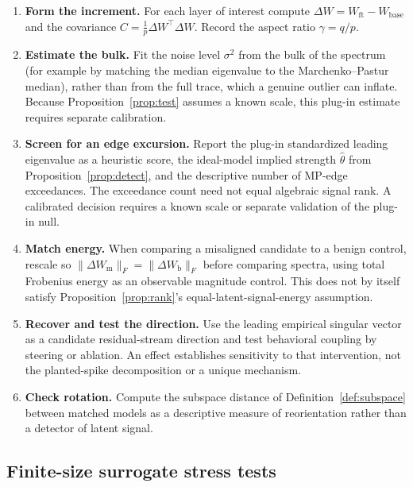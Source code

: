 \documentclass[11pt]{article}
\theoremstyle{definition}
\theoremstyle{remark}
\newcommand{\norm}[1]{\lVert #1 \rVert}
\newcommand{\dW}{\Delta W}
\begin{document}
\begin{enumerate}[leftmargin=1.6em,itemsep=3pt]
\item \textbf{Form the increment.} For each layer of interest compute $\dW = W_{\mathrm{ft}}
- W_{\mathrm{base}}$ and the covariance $C = \tfrac1p \dW^{\!\top}\dW$. Record the aspect
ratio $\gamma = q/p$.
\item \textbf{Estimate the bulk.} Fit the noise level $\sigma^2$ from the bulk of the
spectrum (for example by matching the median eigenvalue to the Marchenko--Pastur median),
rather than from the full trace, which a genuine outlier can inflate. Because
Proposition~\ref{prop:test} assumes a known scale, this plug-in estimate requires separate
calibration.
\item \textbf{Screen for an edge excursion.} Report the plug-in standardized leading
eigenvalue as a heuristic score, the ideal-model implied strength $\hat\theta$ from
Proposition~\ref{prop:detect}, and the descriptive number of MP-edge exceedances. The
exceedance count need not equal algebraic signal rank. A calibrated decision requires a
known scale or separate validation of the plug-in null.
\item \textbf{Match energy.} When comparing a misaligned candidate to a benign control,
rescale so $\norm{\dW_{\mathrm m}}_F = \norm{\dW_{\mathrm b}}_F$ before comparing spectra,
using total Frobenius energy as an observable magnitude control. This does not by
itself satisfy Proposition~\ref{prop:rank}'s equal-latent-signal-energy assumption.
\item \textbf{Recover and test the direction.} Use the leading empirical singular
vector as a candidate residual-stream direction and test behavioral coupling by
steering or ablation. An effect establishes sensitivity to that intervention, not
the planted-spike decomposition or a unique mechanism.
\item \textbf{Check rotation.} Compute the subspace distance of
Definition~\ref{def:subspace} between matched models as a descriptive measure of
reorientation rather than a detector of latent signal.
\end{enumerate}

\subsection{Finite-size surrogate stress tests}
\label{sec:permutation}
\end{document}
